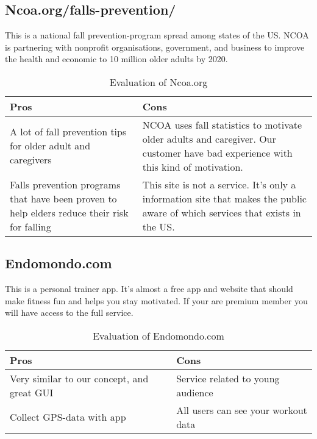 \subsection{Ncoa.org/falls-prevention/}
This is a national fall prevention-program spread among states of the US. NCOA is partnering with nonprofit organisations, government, and business to improve the health and economic to 10 million older adults by 2020.
\begin{table}[H]
\begin{center}
\begin{tabu} to 0.8\textwidth{ |X[l]|X[l]| } 
\hline {}
Pros & Cons \\
\hline
A lot of fall prevention tips for older adult and caregivers & NCOA uses fall statistics to motivate older adults and caregiver. Our customer have bad experience with this kind of motivation.

 \\ 
\hline
Falls prevention programs that have been proven to help elders reduce their risk for falling & This site is not a service. It's only a information site that makes the public aware of which services that exists in the US.

\\ 
\hline
\end{tabu}
\end{center}
\caption{Evaluation of Ncoa.org}
\end{table}

\subsection{Endomondo.com}
This is a personal trainer app. It's almost a free app and website that should make fitness fun and helps you stay motivated. If your are premium member you will have access to the full service.
\begin{table}[H]
\begin{center}
\begin{tabu} to 0.8\textwidth{ |X[l]|X[l]| } 
\hline {}
Pros & Cons \\
\hline
Very similar to our concept, and great GUI & Service related to young audience 

\\ 
\hline
Collect GPS-data with app & All users can see your workout data 

\\ 
\hline
\end{tabu}
\end{center}
\caption{Evaluation of Endomondo.com}
\end{table}

